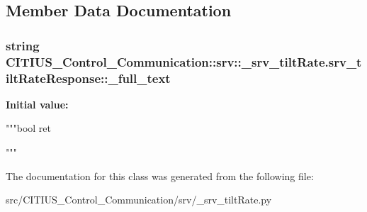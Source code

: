 \subsection{\-Member \-Data \-Documentation}
\hypertarget{class_c_i_t_i_u_s___control___communication_1_1srv_1_1__srv__tilt_rate_1_1srv__tilt_rate_response_ad93f3af9c483b7111dcdfe0e1070f2c0}{
\subsubsection[{\-\_\-full\-\_\-text}]{\setlength{\rightskip}{0pt plus 5cm}string \-C\-I\-T\-I\-U\-S\-\_\-\-Control\-\_\-\-Communication\-::srv\-::\-\_\-srv\-\_\-tilt\-Rate.\-srv\-\_\-tilt\-Rate\-Response\-::\-\_\-full\-\_\-text}}\label{class_c_i_t_i_u_s___control___communication_1_1srv_1_1__srv__tilt_rate_1_1srv__tilt_rate_response_ad93f3af9c483b7111dcdfe0e1070f2c0}
{\bfseries \-Initial value\-:}
\begin{DoxyCode}
"""bool ret


"""
\end{DoxyCode}


\-The documentation for this class was generated from the following file\-:\begin{DoxyCompactItemize}
\item 
src/\-C\-I\-T\-I\-U\-S\-\_\-\-Control\-\_\-\-Communication/srv/\-\_\-srv\-\_\-tilt\-Rate.\-py\end{DoxyCompactItemize}
